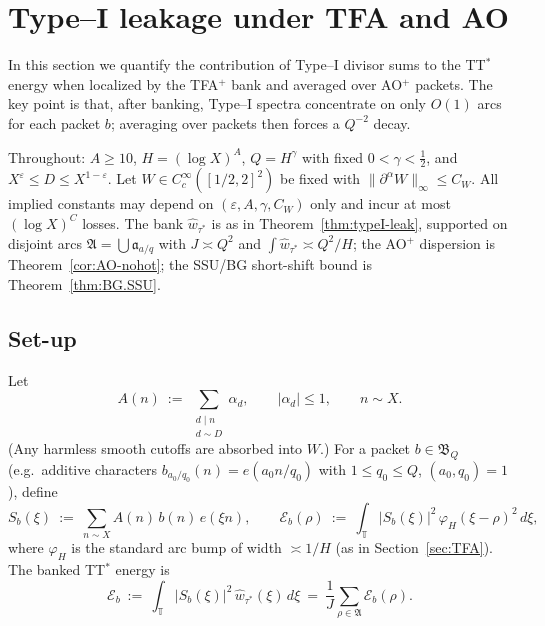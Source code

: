 \section{Type--I leakage under TFA and AO}
\label{sec:typeI}

In this section we quantify the contribution of Type–I divisor sums to the TT$^\ast$ energy when localized by the TFA$^{+}$ bank and averaged over AO$^{+}$ packets. The key point is that, after banking, Type–I spectra concentrate on only $O(1)$ arcs for each packet $b$; averaging over packets then forces a $Q^{-2}$ decay.

Throughout: $A\ge 10$, $H=(\log X)^A$, $Q=H^\gamma$ with fixed $0<\gamma<\frac12$, and $X^\varepsilon\le D\le X^{1-\varepsilon}$. Let $W\in C_c^\infty([1/2,2]^2)$ be fixed with $\|\partial^\alpha W\|_\infty\le C_W$. All implied constants may depend on $(\varepsilon,A,\gamma,C_W)$ only and incur at most $(\log X)^C$ losses. The bank $\widehat w_{\tau^\ast}$ is as in Theorem~\ref{thm:typeI-leak}, supported on disjoint arcs $\mathfrak A=\bigcup \mathfrak a_{a/q}$ with $J\asymp Q^2$ and $\int \widehat w_{\tau^\ast}\asymp Q^2/H$; the AO$^{+}$ dispersion is Theorem~\ref{cor:AO-nohot}; the SSU/BG short-shift bound is Theorem~\ref{thm:BG.SSU}.

\subsection{Set-up}

Let
\[
A(n)\ :=\ \sum_{\substack{d\mid n\\ d\sim D}} \alpha_d,
\qquad |\alpha_d|\le 1,
\qquad n\sim X.
\]
(Any harmless smooth cutoffs are absorbed into $W$.) For a packet $b\in\mathfrak B_Q$ (e.g.\ additive characters $b_{a_0/q_0}(n)=e(a_0 n/q_0)$ with $1\le q_0\le Q$, $(a_0,q_0)=1$), define
\[
S_b(\xi)\ :=\ \sum_{n\sim X} A(n)\,b(n)\,e(\xi n),
\qquad
\mathcal E_b(\rho)\ :=\ \int_{\mathbb{T}} |S_b(\xi)|^2\,\varphi_H(\xi-\rho)^2\,d\xi,
\]
where $\varphi_H$ is the standard arc bump of width $\asymp 1/H$ (as in Section~\ref{sec:TFA}). The banked TT$^\ast$ energy is
\[
\mathcal E_b\ :=\ \int_{\mathbb{T}} |S_b(\xi)|^2\,\widehat w_{\tau^\ast}(\xi)\,d\xi
\ =\ \frac{1}{J}\sum_{\rho\in\mathfrak A} \mathcal E_b(\rho).
\]

